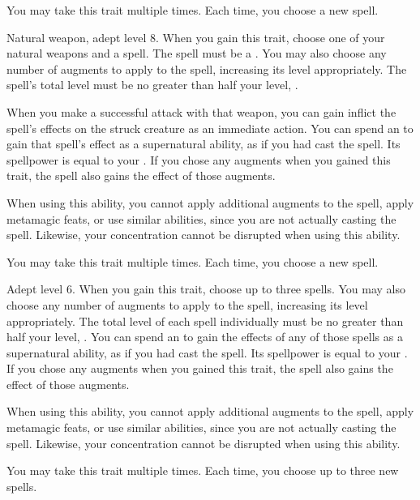      You may take this trait multiple times.
    Each time, you choose a new spell.

    \featpres Natural weapon, adept level 8.
    \featben When you gain this trait, choose one of your natural weapons and a spell.
    The spell must be a .
    You may also choose any number of augments to apply to the spell, increasing its level appropriately.
    The spell's total level must be no greater than half your level, .

    When you make a successful attack with that weapon, you can gain inflict the spell's effects on the struck creature as an immediate action.
    You can spend an  to gain that spell's effect as a supernatural ability, as if you had cast the spell.
    Its spellpower is equal to your .
    If you chose any augments when you gained this trait, the spell also gains the effect of those augments.

    When using this ability, you cannot apply additional augments to the spell, apply metamagic feats, or use similar abilities, since you are not actually casting the spell.
    Likewise, your concentration cannot be disrupted when using this ability.

     You may take this trait multiple times.
    Each time, you choose a new spell.

    \featpre Adept level 6.
    \featben When you gain this trait, choose up to three spells.
    You may also choose any number of augments to apply to the spell, increasing its level appropriately.
    The total level of each spell individually must be no greater than half your level, .
    You can spend an  to gain the effects of any of those spells as a supernatural ability, as if you had cast the spell.
    Its spellpower is equal to your .
    If you chose any augments when you gained this trait, the spell also gains the effect of those augments.

    When using this ability, you cannot apply additional augments to the spell, apply metamagic feats, or use similar abilities, since you are not actually casting the spell.
    Likewise, your concentration cannot be disrupted when using this ability.

     You may take this trait multiple times.
    Each time, you choose up to three new spells.

